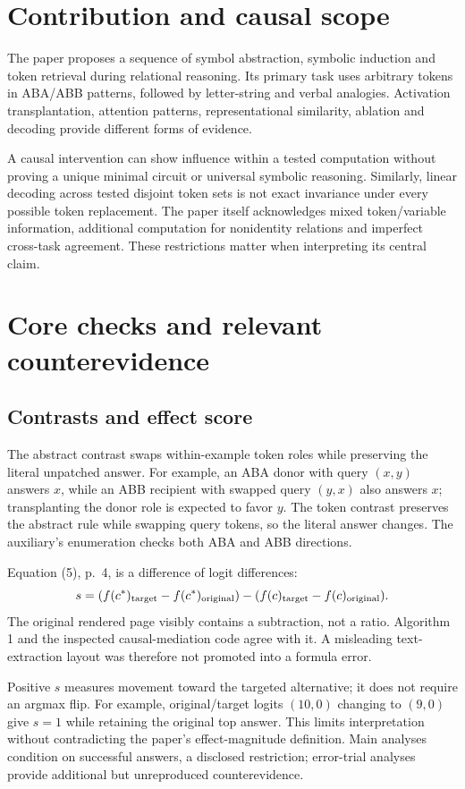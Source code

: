 \documentclass[10pt]{article}
\begin{document}
\section*{Contribution and causal scope}
The paper proposes a sequence of symbol abstraction, symbolic induction and token retrieval during relational reasoning. Its primary task uses arbitrary tokens in ABA/ABB patterns, followed by letter-string and verbal analogies. Activation transplantation, attention patterns, representational similarity, ablation and decoding provide different forms of evidence.\par
A causal intervention can show influence within a tested computation without proving a unique minimal circuit or universal symbolic reasoning. Similarly, linear decoding across tested disjoint token sets is not exact invariance under every possible token replacement. The paper itself acknowledges mixed token/variable information, additional computation for nonidentity relations and imperfect cross-task agreement. These restrictions matter when interpreting its central claim.\par
\section*{Core checks and relevant counterevidence}
\subsection*{Contrasts and effect score}
The abstract contrast swaps within-example token roles while preserving the literal unpatched answer. For example, an ABA donor with query \((x,y)\) answers \(x\), while an ABB recipient with swapped query \((y,x)\) also answers \(x\); transplanting the donor role is expected to favor \(y\). The token contrast preserves the abstract rule while swapping query tokens, so the literal answer changes. The auxiliary’s enumeration checks both ABA and ABB directions.\par
Equation (5), p. 4, is a difference of logit differences: \[s=(f(c^*)_{\rm target}-f(c^*)_{\rm original})
 -(f(c)_{\rm target}-f(c)_{\rm original}).\] The original rendered page visibly contains a subtraction, not a ratio. Algorithm 1 and the inspected causal-mediation code agree with it. A misleading text-extraction layout was therefore not promoted into a formula error.\par
Positive \(s\) measures movement toward the targeted alternative; it does not require an argmax flip. For example, original/target logits \((10,0)\) changing to \((9,0)\) give \(s=1\) while retaining the original top answer. This limits interpretation without contradicting the paper’s effect-magnitude definition. Main analyses condition on successful answers, a disclosed restriction; error-trial analyses provide additional but unreproduced counterevidence.\par
\end{document}
